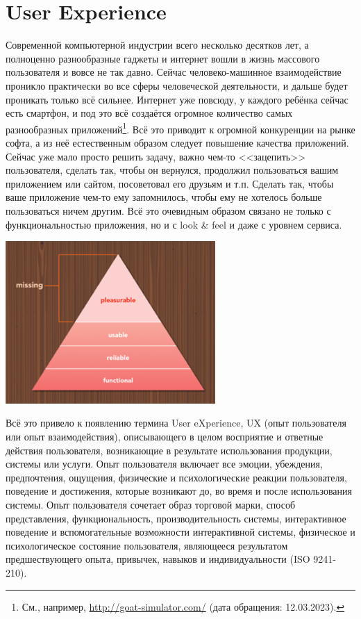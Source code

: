 \documentclass{../../text-style}
\begin{document}
\maketitle
\thispagestyle{empty}


\section{User Experience}

Современной компьютерной индустрии всего несколько десятков лет, а полноценно разнообразные гаджеты и интернет вошли в жизнь массового пользователя и вовсе не так давно. Сейчас человеко-машинное взаимодействие проникло практически во все сферы человеческой деятельности, и дальше будет проникать только всё сильнее. Интернет уже повсюду, у каждого ребёнка сейчас есть смартфон, и под это всё создаётся огромное количество самых разнообразных приложений\footnote{См., например, \url{http://goat-simulator.com/} (дата обращения: 12.03.2023).}. Всё это приводит к огромной конкуренции на рынке софта, а из неё естественным образом следует повышение качества приложений. Сейчас уже мало просто решить задачу, важно чем-то <<зацепить>> пользователя, сделать так, чтобы он вернулся, продолжил пользоваться вашим приложением или сайтом, посоветовал его друзьям и т.п. Сделать так, чтобы ваше приложение чем-то ему запомнилось, чтобы ему не хотелось больше пользоваться ничем другим. Всё это очевидным образом связано не только с функциональностью приложения, но и с look \& feel и даже с уровнем сервиса.

\begin{center}
    \includegraphics[width=0.6\textwidth]{uxPyramid.png}
\end{center}

Всё это привело к появлению термина User eXperience, UX (опыт пользователя или опыт взаимодействия), описывающего в целом восприятие и ответные действия пользователя, возникающие в результате использования продукции, системы или услуги. Опыт пользователя включает все эмоции, убеждения, предпочтения, ощущения, физические и психологические реакции пользователя, поведение и достижения, которые возникают до, во время и после использования системы. Опыт пользователя сочетает образ торговой марки, способ представления, функциональность, производительность системы, интерактивное поведение и вспомогательные возможности интерактивной системы, физическое и психологическое состояние пользователя, являющееся результатом предшествующего опыта, привычек, навыков и индивидуальности (ISO 9241-210).
\end{document}
